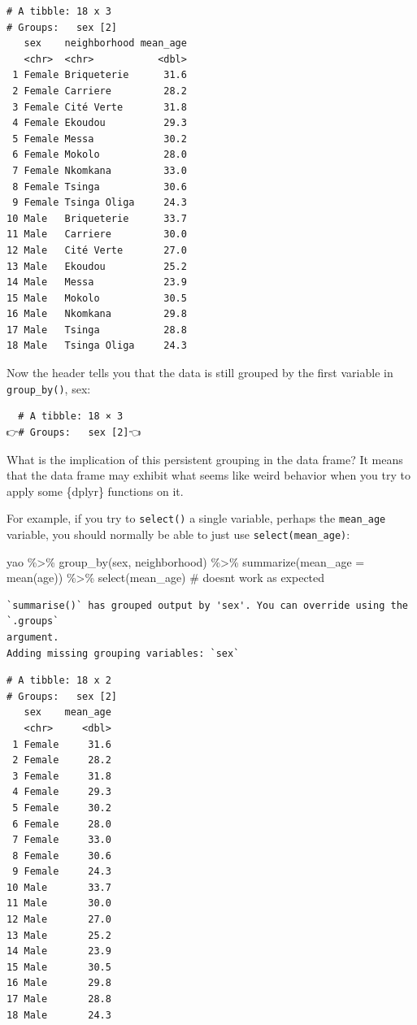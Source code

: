 \documentclass[
  letterpaper,
  DIV=11,
  numbers=noendperiod]{scrreprt}
\newenvironment{Shaded}{\begin{snugshade}}{\end{snugshade}}
\newcommand{\AttributeTok}[1]{\textcolor[rgb]{0.40,0.45,0.13}{#1}}
\newcommand{\CommentTok}[1]{\textcolor[rgb]{0.37,0.37,0.37}{#1}}
\newcommand{\FunctionTok}[1]{\textcolor[rgb]{0.28,0.35,0.67}{#1}}
\newcommand{\NormalTok}[1]{\textcolor[rgb]{0.00,0.23,0.31}{#1}}
\newcommand{\SpecialCharTok}[1]{\textcolor[rgb]{0.37,0.37,0.37}{#1}}
\begin{document}
\begin{verbatim}
# A tibble: 18 x 3
# Groups:   sex [2]
   sex    neighborhood mean_age
   <chr>  <chr>           <dbl>
 1 Female Briqueterie      31.6
 2 Female Carriere         28.2
 3 Female Cité Verte       31.8
 4 Female Ekoudou          29.3
 5 Female Messa            30.2
 6 Female Mokolo           28.0
 7 Female Nkomkana         33.0
 8 Female Tsinga           30.6
 9 Female Tsinga Oliga     24.3
10 Male   Briqueterie      33.7
11 Male   Carriere         30.0
12 Male   Cité Verte       27.0
13 Male   Ekoudou          25.2
14 Male   Messa            23.9
15 Male   Mokolo           30.5
16 Male   Nkomkana         29.8
17 Male   Tsinga           28.8
18 Male   Tsinga Oliga     24.3
\end{verbatim}

Now the header tells you that the data is still grouped by the first
variable in \texttt{group\_by()}, sex:

\begin{verbatim}
  # A tibble: 18 × 3
👉# Groups:   sex [2]👈
\end{verbatim}

What is the implication of this persistent grouping in the data frame?
It means that the data frame may exhibit what seems like weird behavior
when you try to apply some \{dplyr\} functions on it.

For example, if you try to \texttt{select()} a single variable, perhaps
the \texttt{mean\_age} variable, you should normally be able to just use
\texttt{select(mean\_age)}:

\begin{Shaded}
\begin{Highlighting}[]
\NormalTok{yao }\SpecialCharTok{\%\textgreater{}\%} 
  \FunctionTok{group\_by}\NormalTok{(sex, neighborhood) }\SpecialCharTok{\%\textgreater{}\%} 
  \FunctionTok{summarize}\NormalTok{(}\AttributeTok{mean\_age =} \FunctionTok{mean}\NormalTok{(age)) }\SpecialCharTok{\%\textgreater{}\%} 
  \FunctionTok{select}\NormalTok{(mean\_age) }\CommentTok{\# doesn\textquotesingle{}t work as expected }
\end{Highlighting}
\end{Shaded}

\begin{verbatim}
`summarise()` has grouped output by 'sex'. You can override using the `.groups`
argument.
Adding missing grouping variables: `sex`
\end{verbatim}

\begin{verbatim}
# A tibble: 18 x 2
# Groups:   sex [2]
   sex    mean_age
   <chr>     <dbl>
 1 Female     31.6
 2 Female     28.2
 3 Female     31.8
 4 Female     29.3
 5 Female     30.2
 6 Female     28.0
 7 Female     33.0
 8 Female     30.6
 9 Female     24.3
10 Male       33.7
11 Male       30.0
12 Male       27.0
13 Male       25.2
14 Male       23.9
15 Male       30.5
16 Male       29.8
17 Male       28.8
18 Male       24.3
\end{verbatim}
\end{document}
